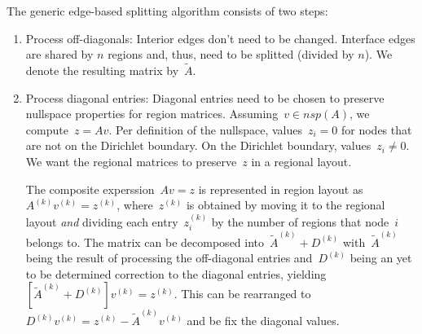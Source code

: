 \documentclass[11pt]{article}
\begin{document}
The generic edge-based splitting algorithm consists of two steps:
\begin{enumerate}
\item Process off-diagonals: Interior edges don't need to be changed.
Interface edges are shared by $n$ regions and, thus, need to be splitted (divided by $n$).
We denote the resulting matrix by~$\tilde{A}$.
\item Process diagonal entries: Diagonal entries need to be chosen to preserve
nullspace properties for region matrices. Assuming~$v \in nsp(A)$, we compute~$z = Av$.
Per definition of the nullspace, values~$z_i = 0$ for nodes that are not on the Dirichlet boundary.
On the Dirichlet boundary, values~$z_i \neq 0$.
We want the regional matrices to preserve~$z$ in a regional layout.

The composite experssion~$Av = z$ is represented in region layout as~$A^{(k)}v^{(k)} = z^{(k)}$,
where~$z^{(k)}$ is obtained by moving it to the regional layout \emph{and}
dividing each entry~$z^{(k)}_i$ by the number of regions that node~$i$ belongs to.
The matrix can be decomposed into~$\tilde{A}^{(k)} + D^{(k)}$ with~$\tilde{A}^{(k)}$ being
the result of processing the off-diagonal entries and~$D^{(k)}$ being an yet to be determined
correction to the diagonal entries, yielding~$[\tilde{A}^{(k)} + D^{(k)}]v^{(k)} = z^{(k)}$.
This can be rearranged to~$D^{(k)}v^{(k)} = z^{(k)} - \tilde{A}^{(k)}v^{(k)}$
and be fix the diagonal values.

\end{enumerate}
\end{document}
